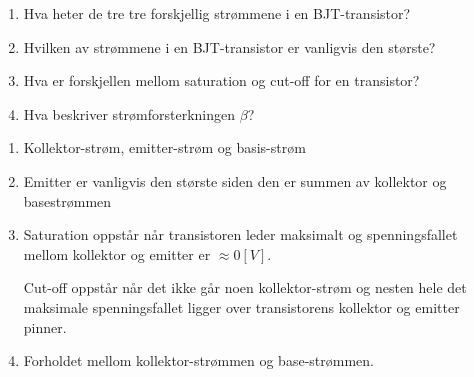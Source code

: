 \begin{question}[name=Oppgave, topic=transBJT]
	\begin{enumerate}[label=\roman*)]
		\item Hva heter de tre tre forskjellig strømmene i en BJT-transistor?
		\item Hvilken av strømmene i en BJT-transistor er vanligvis den største?
		\item Hva er forskjellen mellom saturation og cut-off for en transistor?
		\item Hva beskriver strømforsterkningen $\beta$?
	\end{enumerate}

\end{question}

\vspace{0.5cm} %

\begin{solution}[name=Løsningsforslag oppgave]
		\begin{enumerate}[label=\roman*)]
		\item Kollektor-strøm, emitter-strøm og basis-strøm
		\item Emitter er vanligvis den største siden den er summen av kollektor og basestrømmen
		\item Saturation oppstår når transistoren leder maksimalt og spenningsfallet mellom kollektor og emitter er $\approx 0 [V]$.
		
		Cut-off oppstår når det ikke går noen kollektor-strøm og nesten hele det maksimale spenningsfallet ligger over transistorens kollektor og emitter pinner.
		\item Forholdet mellom kollektor-strømmen og base-strømmen.
	\end{enumerate}

\end{solution}


